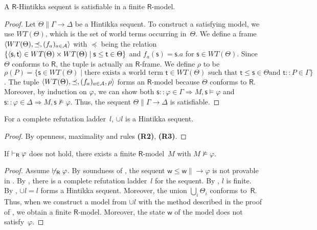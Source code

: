    \begin{proposition}
    \label{Hsat}
    A $\mathsf R$-Hintikka sequent is satisfiable in a finite $\mathsf R$-model.
   \end{proposition}
   \begin{proof}
    \newcommand{\W}{WT(\Theta)}
    Let $\Theta\parallel \Gamma\longrightarrow\Delta$ be a Hintikka sequent.
    To construct a satisfying model, we use $\W$,
    which is the set of world
    terms occurring in~$\Theta$.
    We define a frame $\tuple{\W, \preceq, (f_a)_{a\in\agents}}$ with
    $\preceq$ being the relation $\{\tuple{\mathsf s,\mathsf t}\in
    \W\times \W\mid
    \mathsf s\le
    \mathsf t\in\Theta\}$ and
    $f_a(\mathsf s) = \mathsf s.a$ for $\mathsf s\in\W$\enspace.
    Since $\Theta$ conforms to $\mathsf R$,
    the tuple is actually an $\mathsf R$-frame.
    We define $\rho$ to be $\rho(P) =
    \{\mathsf s\in \W\mid
    \mbox{there exists a world term } \mathsf t \in \W \mbox{ such that }
    \mathsf t\le
    \mathsf s \in \Theta\mbox{
    and }\mathsf t::P\in \Gamma\}$.
    The tuple $\tuple{\W,\preceq,(f_a)_{a\in \agents},\rho}$ forms
    an $\mathsf R$-model because $\Theta$ conforms to $\mathsf R$.
    Moreover, by induction on $\varphi$, we can show both
    $\mathsf s::\varphi\in\Gamma\Longrightarrow M,\mathsf s\models\varphi$
    and
    $\mathsf s::\varphi\in\Delta\Longrightarrow M,\mathsf s\not\models\varphi$.
    Thus, the sequent $\Theta\parallel \Gamma\longrightarrow\Delta$ is satisfiable.
   \end{proof}

   \begin{proposition}
    \label{completehintikka}
    For a complete refutation ladder~$l$,
    $\cup l$ is a Hintikka sequent.
   \end{proposition}
   \begin{proof}
    By openness, maximality and rules \textbf{(R2)}, \textbf{(R3)}.
   \end{proof}

   \begin{proposition}
    \label{R-fmp}
    If $\vdash_{\mathsf R}\varphi$  does not hold, there exists a finite $\mathsf
    R$-model~$M$ with $M\not\models\varphi$.
   \end{proposition}
   \begin{proof}
    Assume $\not\vdash_{\mathsf R}\varphi$.
    By soundness of \LB,
    the sequent $\mathsf w\le\mathsf w\parallel \longrightarrow\varphi$ is not
    provable in \LB.
    By ,
    there is a complete refutation ladder~$l$ for the sequent.
    By , $l$ is finite.
    By ,
    $\cup l = l$  forms a Hintikka
    sequent.
    Moreover,
    the union $\bigcup_i\Theta_i$ conforms to~$\mathsf
    R$.
    Thus, when we construct a model from $\cup l$ with the method described in
    the proof of ,
    we obtain a finite $\mathsf R$-model.
    Moreover, the state $\mathsf w$ of the model does not satisfy~$\varphi$.
   \end{proof}
